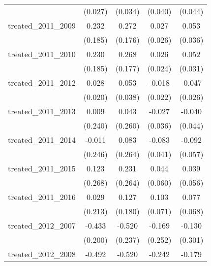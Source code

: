 {\begin{tabular}{l*{4}{c}}
            &     (0.027)         &     (0.034)         &     (0.040)         &     (0.044)         \\
[1em]
treated\_2011\_2009&       0.232         &       0.272         &       0.027         &       0.053         \\
            &     (0.185)         &     (0.176)         &     (0.026)         &     (0.036)         \\
[1em]
treated\_2011\_2010&       0.230         &       0.268         &       0.026         &       0.052         \\
            &     (0.185)         &     (0.177)         &     (0.024)         &     (0.031)         \\
[1em]
treated\_2011\_2012&       0.028         &       0.053         &      -0.018         &      -0.047         \\
            &     (0.020)         &     (0.038)         &     (0.022)         &     (0.026)         \\
[1em]
treated\_2011\_2013&       0.009         &       0.043         &      -0.027         &      -0.040         \\
            &     (0.240)         &     (0.260)         &     (0.036)         &     (0.044)         \\
[1em]
treated\_2011\_2014&      -0.011         &       0.083         &      -0.083\sym{*}  &      -0.092         \\
            &     (0.246)         &     (0.264)         &     (0.041)         &     (0.057)         \\
[1em]
treated\_2011\_2015&       0.123         &       0.231         &       0.044         &       0.039         \\
            &     (0.268)         &     (0.264)         &     (0.060)         &     (0.056)         \\
[1em]
treated\_2011\_2016&       0.029         &       0.127         &       0.103         &       0.077         \\
            &     (0.213)         &     (0.180)         &     (0.071)         &     (0.068)         \\
[1em]
treated\_2012\_2007&      -0.433\sym{*}  &      -0.520\sym{*}  &      -0.169         &      -0.130         \\
            &     (0.200)         &     (0.237)         &     (0.252)         &     (0.301)         \\
[1em]
treated\_2012\_2008&      -0.492\sym{*}  &      -0.520\sym{*}  &      -0.242         &      -0.179         \\

\end{tabular}}
